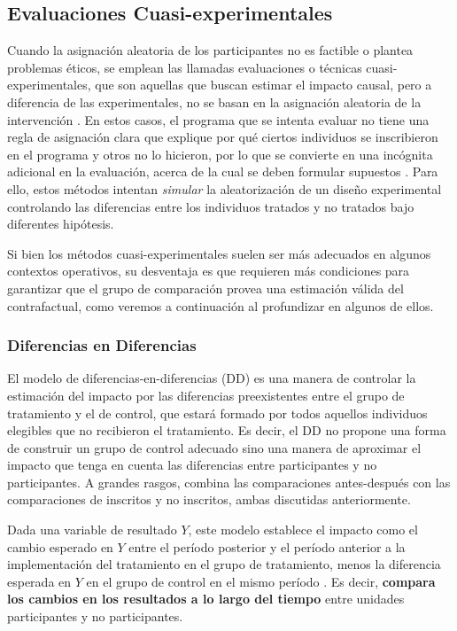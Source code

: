 \documentclass[../../main.tex]{subfiles}
\begin{document}
\subsection{Evaluaciones Cuasi-experimentales}
Cuando la asignación aleatoria de los participantes no es factible o plantea problemas
éticos, se emplean las llamadas evaluaciones o técnicas cuasi-experimentales, que son
aquellas que buscan estimar el impacto causal, pero a diferencia de las experimentales, no
se basan en la asignación aleatoria de la intervención \cite{gertler-2016}. En estos
casos, el programa que se intenta evaluar no tiene una regla de asignación clara que
explique por qué ciertos individuos se inscribieron en el programa y otros no lo hicieron,
por lo que se convierte en una incógnita adicional en la evaluación, acerca de la cual se
deben formular supuestos \cite{gertler-2016}. Para ello, estos métodos intentan
\textit{simular} la aleatorización de un diseño experimental controlando las diferencias
entre los individuos tratados y no tratados bajo diferentes hipótesis.

Si bien los métodos cuasi-experimentales suelen ser más adecuados en algunos contextos
operativos, su desventaja es que requieren más condiciones para garantizar que el grupo de
comparación provea una estimación válida del contrafactual, como veremos a continuación al
profundizar en algunos de ellos.

\subsubsection{Diferencias en Diferencias}
El modelo de diferencias-en-diferencias (DD) es una manera de controlar la estimación del
impacto por las diferencias preexistentes entre el grupo de tratamiento y el de control,
que estará formado por todos aquellos individuos elegibles que no recibieron el
tratamiento. Es decir, el DD no propone una forma de construir un grupo de control
adecuado sino una manera de aproximar el impacto que tenga en cuenta las diferencias entre
participantes y no participantes. A grandes rasgos, combina las comparaciones
antes-después con las comparaciones de inscritos y no inscritos, ambas discutidas
anteriormente.

Dada una variable de resultado \(Y\), este modelo establece el impacto como el cambio
esperado en \(Y\) entre el período posterior y el período anterior a la implementación del
tratamiento en el grupo de tratamiento, menos la diferencia esperada en \(Y\) en el grupo
de control en el mismo período \cite{bernal}. Es decir, \textbf{compara los cambios en los
resultados a lo largo del tiempo} entre unidades participantes y no participantes.
\end{document}
